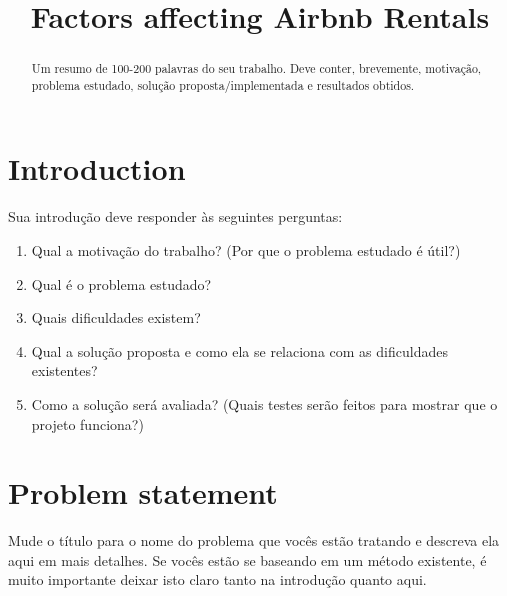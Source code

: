\documentclass[10pt,conference]{IEEEtran}
\begin{document}
\title{Factors affecting Airbnb Rentals}

\newif\iffinal
\finalfalse
\finaltrue
\newcommand{\jemsid}{99999}

\iffinal
\author{



}




\maketitle

\begin{abstract}
Um resumo de 100-200 palavras do seu trabalho. Deve conter, brevemente, motivação, problema estudado, solução proposta/implementada e resultados obtidos.
\end{abstract}
\IEEEpeerreviewmaketitle

\section{Introduction}

Sua introdução deve responder às seguintes perguntas:

\begin{enumerate}
\item Qual a motivação do trabalho? (Por que o problema estudado é útil?)
\item Qual é o problema estudado?
\item Quais dificuldades existem?
\item Qual a solução proposta e como ela se relaciona com as dificuldades existentes?
\item Como a solução será avaliada? (Quais testes serão feitos para mostrar que o projeto funciona?)
\end{enumerate}

\section{Problem statement}

Mude o título para o nome do problema que vocês estão tratando e descreva ela aqui em mais detalhes. Se vocês estão se baseando em um método existente, é muito importante deixar isto claro tanto na introdução quanto aqui. 
\end{document}
